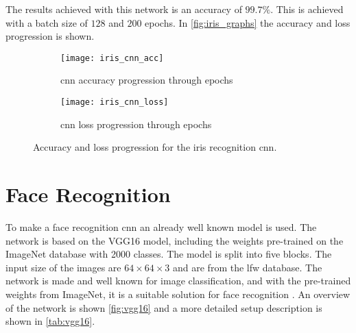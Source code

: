 The results achieved with this network is an accuracy of $99.7\%$. This is achieved with a batch size of $128$ and $200$ epochs. In \autoref{fig:iris_graphs} the accuracy and loss progression is shown.

\begin{figure}[H]
	\centering
	\begin{subfigure}{0.48\textwidth}
		\centering
		\texttt{[image: iris\_cnn\_acc]}
		\caption{\gls{cnn} accuracy progression through epochs}
		\label{fig:iris_cnn_acc}
	\end{subfigure}
	\begin{subfigure}{0.48\textwidth}
		\centering
		\texttt{[image: iris\_cnn\_loss]}
		\caption{\gls{cnn} loss progression through epochs}
		\label{fig:iris_cnn_loss}
	\end{subfigure}
	\caption{Accuracy and loss progression for the iris recognition \gls{cnn}.}
	\label{fig:iris_graphs}
\end{figure}

\section{Face Recognition}
To make a face recognition \gls{cnn} an already well known model is used. The network is based on the VGG16 model, including the weights pre-trained on the ImageNet database with 2000 classes. The model is split into five blocks. The input size of the images are $64\times64\times3$ and are from the \gls{lfw} database. The network is made and well known for image classification, and with the pre-trained weights from ImageNet, it is a suitable solution for face recognition \citep{Simonyan2015}.
An overview of the network is shown \autoref{fig:vgg16} and a more detailed setup description is shown in \autoref{tab:vgg16}.

